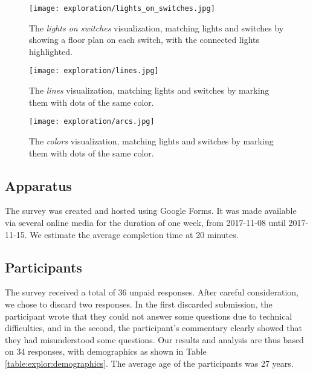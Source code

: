     \begin{figure}
        \centering
        \texttt{[image: exploration/lights\_on\_switches.jpg]}
        \caption{The \textit{lights on switches} visualization, matching lights and switches by showing a floor plan on each switch, with the connected lights highlighted.}
        \label{fig:explor:lights_on_switches_vis}
    \end{figure}
    
    \begin{figure}
        \centering
        \texttt{[image: exploration/lines.jpg]}
        \caption{The \textit{lines} visualization, matching lights and switches by marking them with dots of the same color.}
        \label{fig:explor:lines_vis}
    \end{figure}
    
    \begin{figure}
        \centering
        \texttt{[image: exploration/arcs.jpg]}
        \caption{The \textit{colors} visualization, matching lights and switches by marking them with dots of the same color.}
        \label{fig:explor:arcs_vis}
    \end{figure}

    \subsection{Apparatus} \label{subsec:explor:survey:apparatus}
    The survey was created and hosted using Google Forms. It was made available via several online media for the duration of one week, from 2017-11-08 until 2017-11-15. We estimate the average completion time at 20 minutes.

    \subsection{Participants} \label{subsec:explor:survey:participants}
    The survey received a total of 36 unpaid responses. After careful consideration, we chose to discard two responses. In the first discarded submission, the participant wrote that they could not answer some questions due to technical difficulties, and in the second, the participant's commentary clearly showed that they had misunderstood some questions. Our results and analysis are thus based on 34 responses, with demographics as shown in Table \ref{table:explor:demographics}. The average age of the participants was 27 years.

